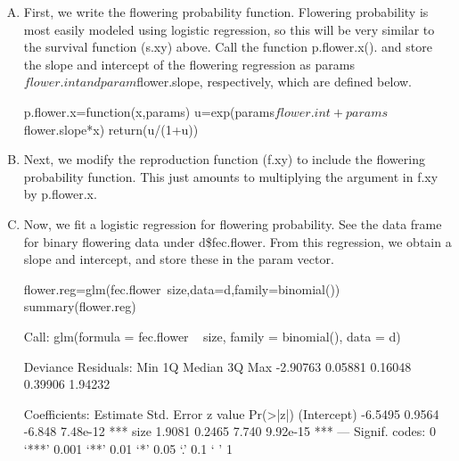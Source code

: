 \documentclass[11pt]{article}
\begin{document}
\begin{enumerate}[(A)]
\item First, we write the flowering probability function. Flowering probability is most easily modeled using logistic regression, so this will be very similar to the survival function (s.xy) above. Call the function p.flower.x(). and store the slope and intercept of the flowering regression as params$flower.int and param$flower.slope, respectively, which are defined below.
\begin{Schunk}
\begin{Sinput}
 p.flower.x=function(x,params) {
  	u=exp(params$flower.int+params$flower.slope*x)
  	return(u/(1+u))
  }
\end{Sinput}
\end{Schunk}

\item Next, we modify the reproduction function (f.xy) to include the flowering probability function. This just amounts to multiplying the argument in f.xy by p.flower.x. 
\begin{Schunk}
\end{Schunk}

\item Now, we fit a logistic regression for flowering probability. See the data frame for binary flowering data under d\$fec.flower. From this regression, we obtain a slope and intercept, and store these in the param vector.  

\begin{Schunk}
\begin{Sinput}
 flower.reg=glm(fec.flower~size,data=d,family=binomial())
 summary(flower.reg)
\end{Sinput}
\begin{Soutput}
Call:
glm(formula = fec.flower ~ size, family = binomial(), data = d)

Deviance Residuals: 
     Min        1Q    Median        3Q       Max  
-2.90763   0.05881   0.16048   0.39906   1.94232  

Coefficients:
            Estimate Std. Error z value Pr(>|z|)    
(Intercept)  -6.5495     0.9564  -6.848 7.48e-12 ***
size          1.9081     0.2465   7.740 9.92e-15 ***
---
Signif. codes:  
0 ‘***’ 0.001 ‘**’ 0.01 ‘*’ 0.05 ‘.’ 0.1 ‘ ’ 1


\end{Soutput}
\end{Schunk}
\end{enumerate}
\end{document}

